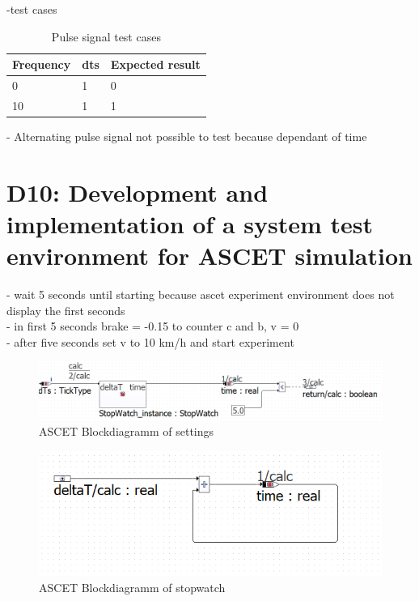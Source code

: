 -test cases

\begin{table}[H]
\centering
\caption{Pulse signal test cases}
\renewcommand{\arraystretch}{1}
\begin{tabular}{lll}
\textbf{Frequency} & \textbf{dts} & \textbf{Expected result} \\\hline
0         & 1   & 0               \\
10        & 1   & 1              
\end{tabular}
\end{table}


- Alternating pulse signal not possible to test because dependant of time 

\chapter{D10: Development and implementation of a system test environment for ASCET simulation}\label{cha:D10}

- wait 5 seconds until starting because ascet experiment environment does not display the first seconds \\
- in first 5 seconds brake = -0.15 to counter c and b, v = 0 \\
- after five seconds set v to 10 km/h and start experiment

\begin{figure}[H]
\centering
\includegraphics[width=1\textwidth]{images/Blockdiagramm_settings.png}
\caption{ASCET Blockdiagramm of settings}
\label{fig:BlockdiagrammSettings}
\end{figure}

\begin{figure}[H]
\centering
\includegraphics[width=1\textwidth]{images/Blockdiagramm_stopwatch.png}
\caption{ASCET Blockdiagramm of stopwatch}
\label{fig:BlockdiagrammStopwatch}
\end{figure}



